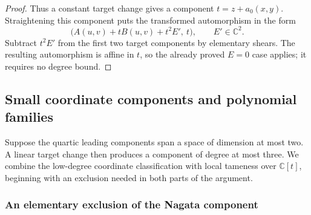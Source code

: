 \documentclass[11pt,reqno]{amsart}
\numberwithin{equation}{section}
\theoremstyle{plain}
\theoremstyle{definition}
\theoremstyle{remark}
\newcommand{\C}{\mathbb C}
\begin{document}
\begin{proof}
Thus a constant target change gives a component $t=z+a_0(x,y)$.
Straightening this component puts the transformed automorphism in the form
\[
 \bigl(A(u,v)+tB(u,v)+t^2E',\ t\bigr),\qquad E'\in\C^2.
\]
Subtract $t^2E'$ from the first two target components by elementary shears.
The resulting automorphism is affine in $t$, so the already proved $E=0$
case applies; it requires no degree bound.
\end{proof}

\subsection{Small coordinate components and polynomial families}\label{t:small}
Suppose the quartic leading components span a space of dimension at most
two. A linear target change then produces a component of degree at most
three. We combine the low-degree coordinate classification with local
tameness over $\C[t]$, beginning with an exclusion needed in both parts
of the argument.

\subsubsection{An elementary exclusion of the Nagata component}
\end{document}
